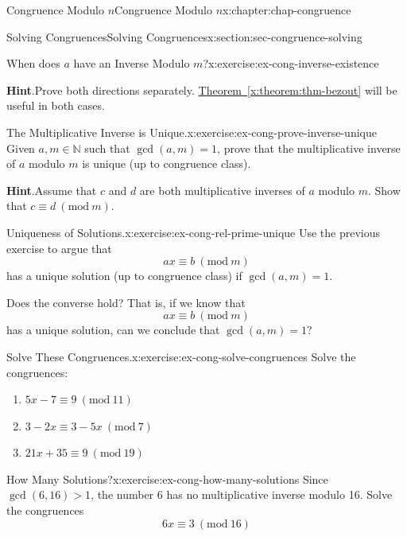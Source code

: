 \documentclass[oneside,10pt,]{book}
\newcommand{\blocktitlefont}{\relax}
\newcommand{\xreffont}{\relax}
\numberwithin{equation}{section}
\newcommand{\Mod}[1]{\ \left(\mathrm{mod}\ #1\right)}
\newcommand{\gt}{>}
\begin{document}
\begin{chapterptx}{Congruence Modulo \(n\)}{}{Congruence Modulo \(n\)}{}{}{x:chapter:chap-congruence}
\begin{sectionptx}{Solving Congruences}{}{Solving Congruences}{}{}{x:section:sec-congruence-solving}
\begin{inlineexercise}{When does \(a\) have an Inverse Modulo \(m\)?}{x:exercise:ex-cong-inverse-existence}
\par\smallskip%
\noindent\textbf{\blocktitlefont Hint}.\hypertarget{g:hint:id538505}{}\quad{}Prove both directions separately. \hyperref[x:theorem:thm-bezout]{Theorem~{\xreffont\ref{x:theorem:thm-bezout}}} will be useful in both cases.%
\end{inlineexercise}%
\begin{inlineexercise}{The Multiplicative Inverse is Unique.}{x:exercise:ex-cong-prove-inverse-unique}%
Given \(a, m \in \mathbb{N}\) such that \(\gcd(a,m) = 1\), prove that the multiplicative inverse of \(a\) modulo \(m\) is unique (up to congruence class).%
\par\smallskip%
\noindent\textbf{\blocktitlefont Hint}.\hypertarget{g:hint:id538562}{}\quad{}Assume that \(c\) and \(d\) are both multiplicative inverses of \(a\) modulo \(m\). Show that \(c \equiv d \Mod{m}\).%
\end{inlineexercise}%
\begin{inlineexercise}{Uniqueness of Solutions.}{x:exercise:ex-cong-rel-prime-unique}%
Use the previous exercise to argue that%
\begin{equation*}
ax \equiv b \Mod{m}
\end{equation*}
has a unique solution (up to congruence class) if \(\gcd(a,m) = 1\).%
\par
Does the converse hold? That is, if we know that%
\begin{equation*}
ax \equiv b \Mod{m}
\end{equation*}
has a unique solution, can we conclude that \(\gcd(a,m) = 1\)?%
\end{inlineexercise}%
\begin{inlineexercise}{Solve These Congruences.}{x:exercise:ex-cong-solve-congruences}%
Solve the congruences:%
\begin{enumerate}[label=(\alph*)]
\item{}\(\displaystyle 5x - 7 \equiv 9 \Mod{11}\)%
\item{}\(\displaystyle 3 - 2x \equiv 3 - 5x \Mod{7}\)%
\item{}\(\displaystyle 21x + 35 \equiv 9 \Mod{19}\)%
\end{enumerate}
%
\end{inlineexercise}%
\begin{inlineexercise}{How Many Solutions?}{x:exercise:ex-cong-how-many-solutions}%
Since \(\gcd(6,16) \gt 1\), the number 6 has no multiplicative inverse modulo 16. Solve the congruences%
\begin{equation*}
6x \equiv 3 \Mod{16}

\end{equation*}
\end{inlineexercise}
\end{sectionptx}
\end{chapterptx}
\end{document}
